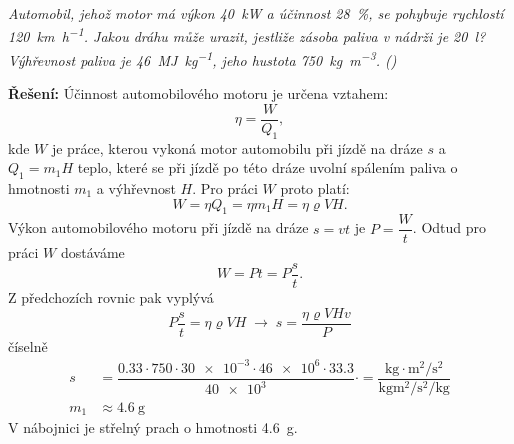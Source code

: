 \begin{mdframed}[style=mdexam]
  \begin{example}\label{FYZ:exam030}
    \emph{Automobil, jehož motor má výkon \SI{40}{\kW}  a účinnost \SI{28}{\percent}, se pohybuje
    rychlostí \SI{120}{\km\per\hour}. Jakou dráhu může urazit, jestliže zásoba paliva v nádrži je
    \SI{20}{\litre}? Výhřevnost paliva je \SI{46}{\mega\joule\per\kg}, jeho hustota
    \SI{750}{\kg\per\cubic\m}. (\cite[s.~33]{Bartuska1997})}
    
    \textbf{Řešení:}\newline 
    Účinnost automobilového motoru je určena vztahem:
    \begin{equation*}
      \eta = \dfrac{W}{Q_1},
    \end{equation*}
    kde \(W\) je práce, kterou vykoná motor automobilu při jízdě na dráze \(s\) a \(Q_1 = m_1H\)
    teplo, které se při jízdě po této dráze uvolní spálením paliva o hmotnosti \(m_1\) a výhřevnost
    \(H\). Pro práci \(W\) proto platí: 
    \begin{equation*}
     W = \eta Q_1 = \eta m_1H = \eta\varrho VH.
    \end{equation*}
    Výkon automobilového motoru při jízdě na dráze \(s = vt\) je \(P=\dfrac{W}{t}\). Odtud pro práci
    \(W\) dostáváme
    \begin{equation*}
      W = Pt = P\dfrac{s}{t}. 
    \end{equation*}
    Z předchozích rovnic pak vyplývá
    \begin{equation*}
      P\dfrac{s}{t} = \eta\varrho VH \;\rightarrow\; s = \dfrac{\eta\varrho VHv}{P}
    \end{equation*}
    číselně
    \begin{align*}
       s  &=  \dfrac{\num{0.33}\cdot750\cdot\num{30e-3}\cdot\num{46e6}\cdot\num{33.3}}{\num{40e3}}
              \cdot                   
           =  \dfrac{\si{\kg}\cdot\si{\square\m\per\square\s}}
                    {\si{\kg\square\m\per\square\s\per\kg}}                                       \\
       m_1 &\approx \SI{4.6}{\g}    
     \end{align*}
     V nábojnici je střelný prach o hmotnosti \SI{4.6}{\g}.
  \end{example} 
\end{mdframed}